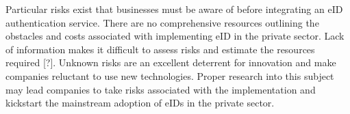 Particular risks exist that businesses must be aware of before integrating an eID authentication service. There are no comprehensive resources outlining the obstacles and costs associated with implementing eID in the private sector. Lack of information makes it difficult to assess risks and estimate the resources required [?]. Unknown risks are an excellent deterrent for innovation and make companies reluctant to use new technologies. Proper research into this subject may lead companies to take risks associated with the implementation and kickstart the mainstream adoption of eIDs in the private sector. 












